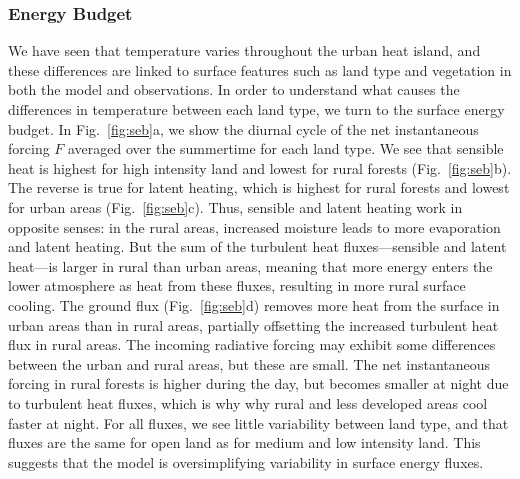 \documentclass[draft,linenumbers]{agujournal}
\begin{document}
\subsubsection{Energy Budget}
We have seen that temperature varies throughout the urban heat island, and these differences are linked to surface features such as land type and vegetation in both the model and observations. 
In order to understand what causes the differences in temperature between each land type, we turn to the surface energy budget. In Fig.~\ref{fig:seb}a, we show the diurnal cycle of the net instantaneous forcing $F$ averaged over the summertime for each land type. We see that sensible heat is highest for high intensity land and lowest for rural forests (Fig.~\ref{fig:seb}b). The reverse is true for latent heating, which is highest for rural forests and lowest for urban areas  (Fig.~\ref{fig:seb}c). Thus, sensible and latent heating work in opposite senses: in the rural areas, increased moisture leads to more evaporation and latent heating. But the sum of the turbulent heat fluxes---sensible and latent heat---is larger in rural than urban areas, meaning that more energy enters the lower atmosphere as heat from these fluxes, resulting in more rural surface cooling. The ground flux  (Fig.~\ref{fig:seb}d) removes more heat from the surface in urban areas than in rural areas, partially offsetting the increased turbulent heat flux in rural areas. The incoming radiative forcing may exhibit some differences between the urban and rural areas, but these are small. 
The net instantaneous forcing in rural forests is higher during the day, but becomes smaller at night due to turbulent heat fluxes, which is why why rural and less developed areas cool faster at night. 
For all fluxes, we see little variability between land type, and that fluxes are the same for open land as for medium and low intensity land. This suggests that the model is oversimplifying variability in surface energy fluxes.
\end{document}
